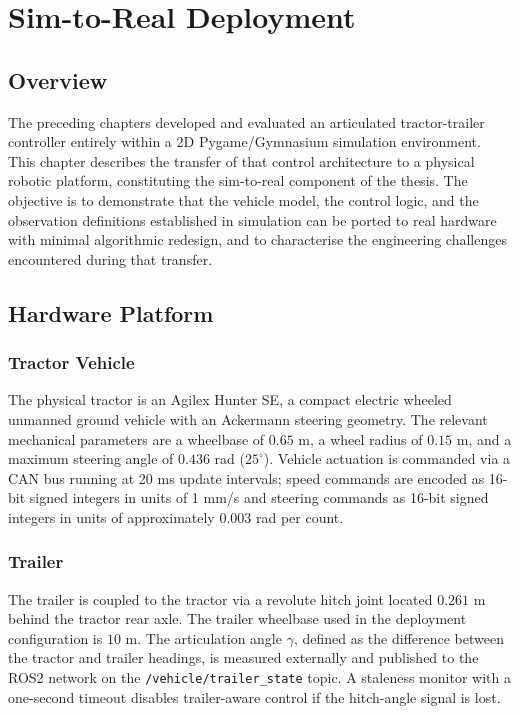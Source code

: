\chapter{Sim-to-Real Deployment}
\label{ch:sim_to_real}

\section{Overview}

The preceding chapters developed and evaluated an articulated tractor-trailer controller entirely within a 2D Pygame/Gymnasium simulation environment. This chapter describes the transfer of that control architecture to a physical robotic platform, constituting the sim-to-real component of the thesis. The objective is to demonstrate that the vehicle model, the control logic, and the observation definitions established in simulation can be ported to real hardware with minimal algorithmic redesign, and to characterise the engineering challenges encountered during that transfer.

\section{Hardware Platform}

\subsection{Tractor Vehicle}

The physical tractor is an Agilex Hunter SE, a compact electric wheeled unmanned ground vehicle with an Ackermann steering geometry. The relevant mechanical parameters are a wheelbase of $0.65$ m, a wheel radius of $0.15$ m, and a maximum steering angle of $0.436$ rad ($25^\circ$). Vehicle actuation is commanded via a CAN bus running at 20 ms update intervals; speed commands are encoded as 16-bit signed integers in units of 1 mm/s and steering commands as 16-bit signed integers in units of approximately $0.003$ rad per count.

\subsection{Trailer}

The trailer is coupled to the tractor via a revolute hitch joint located $0.261$ m behind the tractor rear axle. The trailer wheelbase used in the deployment configuration is $10$ m. The articulation angle $\gamma$, defined as the difference between the tractor and trailer headings, is measured externally and published to the ROS2 network on the \texttt{/vehicle/trailer\_state} topic. A staleness monitor with a one-second timeout disables trailer-aware control if the hitch-angle signal is lost.

